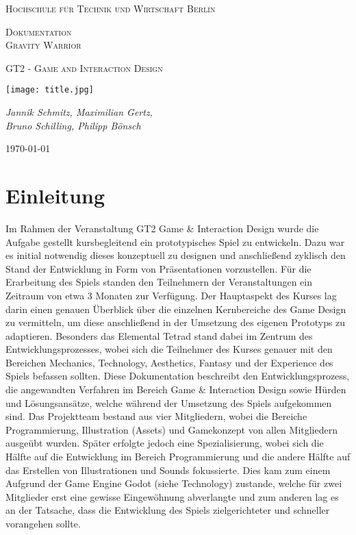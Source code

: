 \documentclass[11pt]{scrartcl}
\begin{document}
\begin{titlepage}
	\centering
	{\scshape\LARGE Hochschule für Technik und Wirtschaft Berlin \par}
	\vspace{1cm}
	{\Huge \scshape{Dokumentation\\ Gravity Warrior}\par}
	\vspace{1cm}
	{\scshape\Large GT2 - Game and Interaction Design\par}
	\vspace{2cm}
	\texttt{[image: title.jpg]}\par\vspace{1cm}
	\vspace{1cm}
	{\large\itshape Jannik Schmitz, Maximilian Gertz,\\Bruno Schilling, Philipp Bönsch\par}
	\vfill
	
	{\large \today\par}
\end{titlepage}

\lstset{basicstyle=\ttfamily\small,breaklines=true}
\newpage
\tableofcontents
\newpage
\section{Einleitung}
Im Rahmen der Veranstaltung GT2 Game \& Interaction Design wurde die Aufgabe gestellt kursbegleitend ein prototypisches Spiel zu entwickeln. Dazu war es initial notwendig dieses konzeptuell zu designen und anschließend zyklisch den Stand der Entwicklung in Form von Präsentationen vorzustellen. Für die Erarbeitung des Spiels standen den Teilnehmern der Veranstaltungen ein Zeitraum von etwa 3 Monaten zur Verfügung. Der Hauptaspekt des Kurses lag darin einen genauen Überblick über die einzelnen Kernbereiche des Game Design zu vermitteln, um diese anschließend in der Umsetzung des eigenen Prototyps zu adaptieren. Besonders das Elemental Tetrad\cite[~p.41]{S2014} stand dabei im Zentrum des Entwicklungsprozesses, wobei sich die Teilnehmer des Kurses genauer mit den Bereichen Mechanics, Technology, Aesthetics, Fantasy und der Experience des Spiels befassen sollten.
Diese Dokumentation beschreibt den Entwicklungsprozess, die angewandten Verfahren im Bereich Game \& Interaction Design sowie Hürden und Lösungsansätze, welche während der Umsetzung des Spiels aufgekommen sind. Das Projektteam bestand aus vier Mitgliedern, wobei die Bereiche Programmierung, Illustration (Assets) und Gamekonzept von allen Mitgliedern ausgeübt wurden. Später erfolgte jedoch eine Spezialisierung, wobei sich die Hälfte auf die Entwicklung im Bereich Programmierung und die andere Hälfte auf das Erstellen von Illustrationen und Sounds fokussierte. Dies kam zum einem Aufgrund der Game Engine Godot (siehe Technology) zustande, welche für zwei Mitglieder erst eine gewisse Eingewöhnung abverlangte und zum anderen lag es an der Tatsache, dass die Entwicklung des Spiels zielgerichteter und schneller vorangehen sollte.
\end{document}
